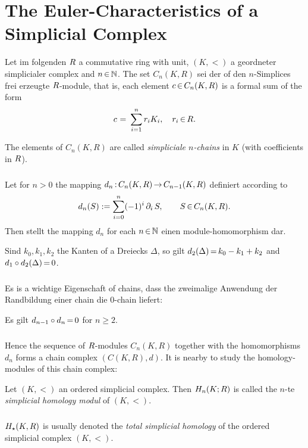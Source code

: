 \documentclass[11pt,twoside]{article}
\def\simK{K}
\begin{document}
\section{The Euler-Characteristics of a Simplicial Complex}
Let im folgenden $R$ a commutative ring with unit,
$(\simK,<)$ a geordneter simplicialer complex and $n {\,\in\,} {\mathbb{N}}$.
The set $C_n(\simK,R)$ sei der of den $n$-Simplices
frei erzeugte $R$-module,
that is,
each element $c \xeof C_n(\simK,R)$ is a formal sum of the form
\[
c \, {\,=\,} \, \sum_{i=1}^n r_i K_i, \quad r_i {\,\in\,} R.
\]

\begin{definition}
The elements of $C_n(\simK,R)$ are called \textit{simpliciale $n$-chains}
in $\simK$ (with coefficients in $R$).
\end{definition}

\subparagraph{}
Let for $n > 0$ the mapping $d_n \: C_n(\simK,R) \xto C_{n-1}(\simK,R)$
definiert according to
\[
d_n(S) := \sum_{i=0}^n (-1)^i \, \partial_i \, S, \qquad S \xeof C_n(\simK,R).
\]
Then stellt the mapping $d_n$ for each $n {\,\in\,} {\mathbb{N}}$
einen module-homomorphism dar.

\begin{example}
Sind $k_0, k_1, k_2$ the Kanten of a Dreiecks $\Delta$,
so gilt $d_2(\Delta) {\,=\,} k_0 - k_1 + k_2$ and $d_1 \circ d_2(\Delta) {\,=\,} 0$.
\end{example}

\subparagraph{}
Es is a wichtige Eigenschaft of chains,
dass the zweimalige Anwendung der Randbildung einer chain
die $0$-chain liefert:

\begin{theorem1}
Es gilt $d_{n-1} \circ d_{n} {\,=\,} 0$ for $n \geq 2$.
\end{theorem1}

\subparagraph{}
Hence the sequence of $R$-modules $C_n(\simK,R)$ together
with the homomorphisms $d_n$ forms a chain complex $(C(\simK,R),d)$.
It is nearby to study the homology-modules of this chain complex:

\begin{definition} %
Let $(\simK,<)$ an ordered simplicial complex.
Then $H_n(\simK;\riR)$ is called
the $n$-te \textit{simplicial homology modul} of $(\simK,<)$.
\end{definition}

\subparagraph{}
$H_{\*}(\simK,R)$ is usually denoted the \textit{total simplicial homology}
of the ordered simplicial complex $(\simK,<)$.
\end{document}
